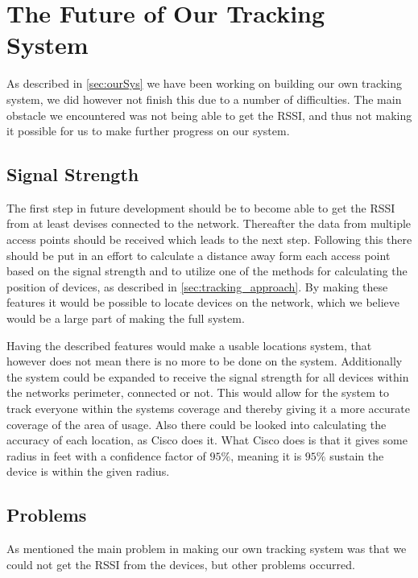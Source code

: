 \section{The Future of Our Tracking System}\label{sec:futureSystem}
As described in \cref{sec:ourSys} we have been working on building our own tracking system, we did however not finish this due to a number of difficulties. The main obstacle we encountered was not being able to get the RSSI, and thus not making it possible for us to make further progress on our system.

\subsection*{Signal Strength}
The first step in future development should be to become able to get the RSSI from at least devises connected to the network. Thereafter the data from multiple access points should be received which leads to the next step. Following this there should be put in an effort to calculate a distance away form each access point based on the signal strength and to utilize one of the methods for calculating the position of devices, as described in \cref{sec:tracking_approach}. By making these features it would be possible to locate devices on the network, which we believe would be a large part of making the full system.

Having the described features would make a usable locations system, that however does not mean there is no more to be done on the system. Additionally the system could be expanded to receive the signal strength for all devices within the networks perimeter, connected or not. This would allow for the system to track everyone within the systems coverage and thereby giving it a more accurate coverage of the area of usage.
Also there could be looked into calculating the accuracy of each location, as Cisco does it. What Cisco does is that it gives some radius in feet with a confidence factor of $95\%$, meaning it is $95\%$ sustain the device is within the given radius\cite{cisco_acc}. 

\subsection*{Problems}
As mentioned the main problem in making our own tracking system was that we could not get the RSSI from the devices, but other problems occurred. 
